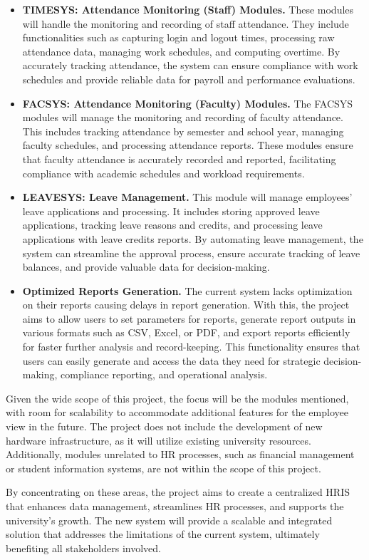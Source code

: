 \begin{itemize}
        \item[] \textbf{TIMESYS: Attendance Monitoring (Staff) Modules.} These modules will handle the monitoring and recording of staff attendance. They include functionalities such as capturing login and logout times, processing raw attendance data, managing work schedules, and computing overtime. By accurately tracking attendance, the system can ensure compliance with work schedules and provide reliable data for payroll and performance evaluations.
        \item[] \textbf{FACSYS: Attendance Monitoring (Faculty) Modules.} The FACSYS modules will manage the monitoring and recording of faculty attendance. This includes tracking attendance by semester and school year, managing faculty schedules, and processing attendance reports. These modules ensure that faculty attendance is accurately recorded and reported, facilitating compliance with academic schedules and workload requirements.
        \item[] \textbf{LEAVESYS: Leave Management.} This module will manage employees' leave applications and processing. It includes storing approved leave applications, tracking leave reasons and credits, and processing leave applications with leave credits reports. By automating leave management, the system can streamline the approval process, ensure accurate tracking of leave balances, and provide valuable data for decision-making.
        \item[] \textbf{Optimized Reports Generation.} The current system lacks optimization on their reports causing delays in report generation. With this, the project aims to allow users to set parameters for reports, generate report outputs in various formats such as CSV, Excel, or PDF, and export reports efficiently for faster further analysis and record-keeping. This functionality ensures that users can easily generate and access the data they need for strategic decision-making, compliance reporting, and operational analysis.
    \end{itemize}
    
    Given the wide scope of this project, the focus will be the modules mentioned, with room for scalability to accommodate additional features for the employee view in the future. The project does not include the development of new hardware infrastructure, as it will utilize existing university resources. Additionally, modules unrelated to HR processes, such as financial management or student information systems, are not within the scope of this project.
    
    By concentrating on these areas, the project aims to create a centralized HRIS that enhances data management, streamlines HR processes, and supports the university's growth. The new system will provide a scalable and integrated solution that addresses the limitations of the current system, ultimately benefiting all stakeholders involved.


